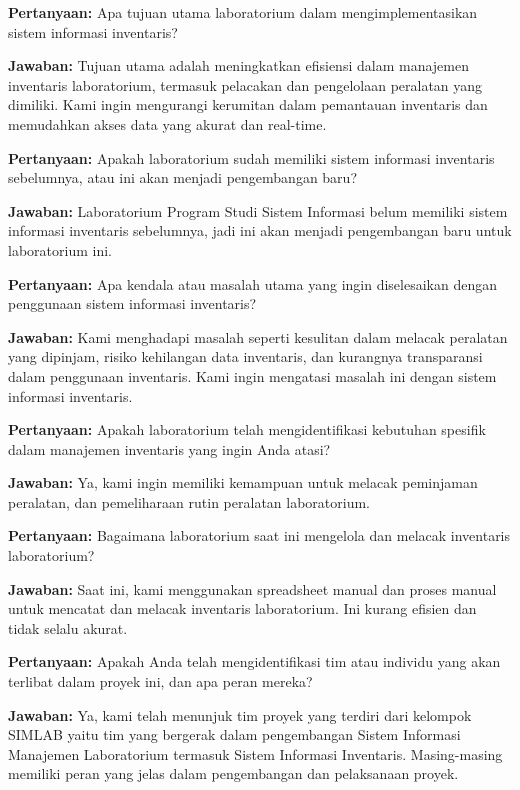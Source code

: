 \begin{flushleft}
	\textbf{Pertanyaan:} Apa tujuan utama laboratorium dalam mengimplementasikan sistem informasi inventaris?

	\textbf{Jawaban:} Tujuan utama adalah meningkatkan efisiensi dalam manajemen inventaris laboratorium, termasuk pelacakan dan pengelolaan peralatan yang dimiliki. Kami ingin mengurangi kerumitan dalam pemantauan inventaris dan memudahkan akses data yang akurat dan real-time.

	\textbf{Pertanyaan:} Apakah laboratorium sudah memiliki sistem informasi inventaris sebelumnya, atau ini akan menjadi pengembangan baru?

	\textbf{Jawaban:} Laboratorium Program Studi Sistem Informasi belum memiliki sistem informasi inventaris sebelumnya, jadi ini akan menjadi pengembangan baru untuk laboratorium ini.

	\textbf{Pertanyaan:} Apa kendala atau masalah utama yang ingin diselesaikan dengan penggunaan sistem informasi inventaris?

	\textbf{Jawaban:} Kami menghadapi masalah seperti kesulitan dalam melacak peralatan yang dipinjam, risiko kehilangan data inventaris, dan kurangnya transparansi dalam penggunaan inventaris. Kami ingin mengatasi masalah ini dengan sistem informasi inventaris.

	\textbf{Pertanyaan:} Apakah laboratorium telah mengidentifikasi kebutuhan spesifik dalam manajemen inventaris yang ingin Anda atasi?

	\textbf{Jawaban:} Ya, kami ingin memiliki kemampuan untuk melacak peminjaman peralatan, dan pemeliharaan rutin peralatan laboratorium.

	\textbf{Pertanyaan:} Bagaimana laboratorium saat ini mengelola dan melacak inventaris laboratorium?

	\textbf{Jawaban:} Saat ini, kami menggunakan spreadsheet manual dan proses manual untuk mencatat dan melacak inventaris laboratorium. Ini kurang efisien dan tidak selalu akurat.

	\textbf{Pertanyaan:} Apakah Anda telah mengidentifikasi tim atau individu yang akan terlibat dalam proyek ini, dan apa peran mereka?

	\textbf{Jawaban:} Ya, kami telah menunjuk tim proyek yang terdiri dari kelompok SIMLAB yaitu tim yang bergerak dalam pengembangan Sistem Informasi Manajemen Laboratorium termasuk Sistem Informasi Inventaris. Masing-masing memiliki peran yang jelas dalam pengembangan dan pelaksanaan proyek.


\end{flushleft}
